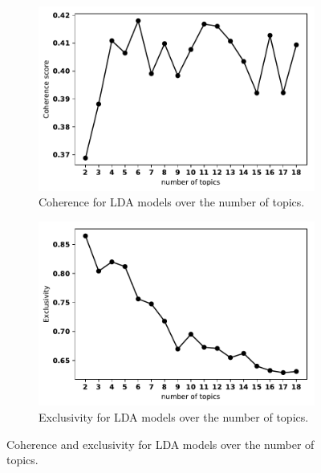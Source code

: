 \documentclass{article}
\theoremstyle{definition}
\begin{document}
\begin{figure}[!hbtp]
    \centering
    \begin{subfigure}{.45\textwidth}
        \centering
        \includegraphics[width=\textwidth]{coherence_values.pdf}
        \caption{Coherence for LDA models over the number of topics.}
        \label{fig:coherence_value_over_number_of_topics}
    \end{subfigure}\hfill
    \begin{subfigure}{.45\textwidth}
        \centering
        \includegraphics[width=\textwidth]{exclusivity_values.pdf}
        \caption{Exclusivity for LDA models over the number of topics.}
        \label{fig:exclusivity_value_over_number_of_topics}
    \end{subfigure}
    \caption{Coherence and exclusivity for LDA models over the number of topics.}
\end{figure}
\end{document}
